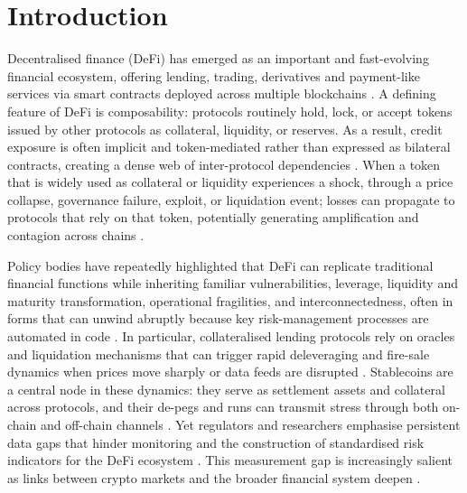 \documentclass[preprint,12pt]{elsarticle}
\begin{document}
\newpage
\tableofcontents

\section{Introduction}



Decentralised finance (DeFi) has emerged as an important and fast-evolving financial ecosystem, offering lending, trading, derivatives and payment-like services via smart contracts deployed across multiple blockchains \cite{Schar2021DeFi,Gogol2024SoKDeFi}. A defining feature of DeFi is composability: protocols routinely hold, lock, or accept tokens issued by other protocols as collateral, liquidity, or reserves. As a result, credit exposure is often implicit and token-mediated rather than expressed as bilateral contracts, creating a dense web of inter-protocol dependencies \cite{wu2025,Bertomeu2024}. When a token that is widely used as collateral or liquidity experiences a shock, through a price collapse, governance failure, exploit, or liquidation event; losses can propagate to protocols that rely on that token, potentially generating amplification and contagion across chains \cite{Aufiero2025,Gogol2024SoKDeFi}. 

Policy bodies have repeatedly highlighted that DeFi can replicate traditional financial functions while inheriting familiar vulnerabilities, leverage, liquidity and maturity transformation, operational fragilities, and interconnectedness, often in forms that can unwind abruptly because key risk-management processes are automated in code \cite{FSB2023,IOSCO2023DeFi}. In particular, collateralised lending protocols rely on oracles and liquidation mechanisms that can trigger rapid deleveraging and fire-sale dynamics when prices move sharply or data feeds are disrupted \cite{DuleyEtAl2023Oracle,SasiBrodeskyNassr2023DeFiLiquidations,TianZhu2025Liquidations}. Stablecoins are a central node in these dynamics: they serve as settlement assets and collateral across protocols, and their de-pegs and runs can transmit stress through both on-chain and off-chain channels \cite{KosseEtAl2023Stablecoin,AnaduEtAl2023StablecoinsMMF,ESRB2025}. Yet regulators and researchers emphasise persistent data gaps that hinder monitoring and the construction of standardised risk indicators for the DeFi ecosystem \cite{FSB2023,IOSCO2023DeFi}. This measurement gap is increasingly salient as links between crypto markets and the broader financial system deepen \cite{ESRB2025}.
\end{document}

